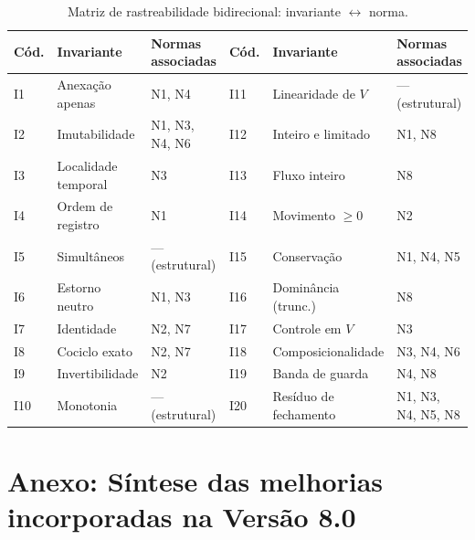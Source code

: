 \documentclass[11pt, a4paper]{article}
\theoremstyle{definition}
\theoremstyle{plain}
\theoremstyle{remark}
\begin{document}
\begin{table}[htbp]
\centering
\small
\begin{tabular}{@{}lll@{\hspace{2.5em}}lll@{}}
\toprule
\textbf{Cód.} & \textbf{Invariante} & \textbf{Normas associadas} & \textbf{Cód.} & \textbf{Invariante} & \textbf{Normas associadas} \\
\midrule
I1  & Anexação apenas     & N1, N4           & I11 & Linearidade de $V$    & --- (estrutural) \\
I2  & Imutabilidade       & N1, N3, N4, N6   & I12 & Inteiro e limitado    & N1, N8 \\
I3  & Localidade temporal & N3               & I13 & Fluxo inteiro         & N8 \\
I4  & Ordem de registro   & N1               & I14 & Movimento $\ge 0$     & N2 \\
I5  & Simultâneos         & --- (estrutural) & I15 & Conservação           & N1, N4, N5 \\
I6  & Estorno neutro      & N1, N3           & I16 & Dominância (trunc.)   & N8 \\
I7  & Identidade          & N2, N7           & I17 & Controle em $V$       & N3 \\
I8  & Cociclo exato       & N2, N7           & I18 & Composicionalidade    & N3, N4, N6 \\
I9  & Invertibilidade     & N2               & I19 & Banda de guarda       & N4, N8 \\
I10 & Monotonia           & --- (estrutural) & I20 & Resíduo de fechamento & N1, N3, N4, N5, N8 \\
\bottomrule
\end{tabular}
\caption{Matriz de rastreabilidade bidirecional: invariante $\leftrightarrow$ norma.}
\label{tab:10}
\end{table}

\section*{Anexo: Síntese das melhorias incorporadas na Versão 8.0}
\end{document}
